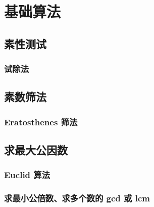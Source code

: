 
\section{基础算法}
\frame{}%
\subsection{素性测试}
\begin{frame}[c]
  \progressnow*
\end{frame}
\frame{}%
\subsubsection{试除法}
\begin{frame}[c]
  \progressnow
\end{frame}
\frame{}%
\subsection{素数筛法}
\begin{frame}[c]
  \progressnow*
\end{frame}
\frame{}%
\subsubsection{Eratosthenes 筛法}
\begin{frame}[c]
  \progressnow
\end{frame}
\frame{}%
\subsection{求最大公因数}
\begin{frame}[c]
  \progressnow*
\end{frame}
\frame{}%
\subsubsection{Euclid 算法}
\begin{frame}[c]
  \progressnow
\end{frame}
\frame{}%
\subsubsection{求最小公倍数、求多个数的 gcd 或 lcm}
\begin{frame}[c]
  \progressnow
\end{frame}
\frame{}%
